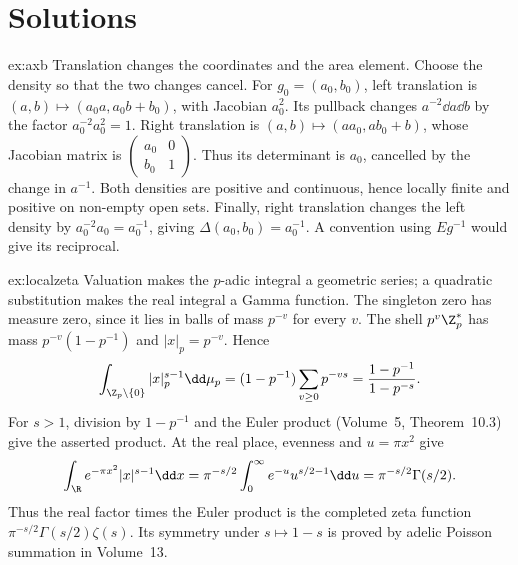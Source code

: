 \section{Solutions}
\begin{solution}{ex:axb}
\idea Translation changes the coordinates and the area element. Choose the density so that the two changes cancel.
\writeup For $g_0=(a_0,b_0)$, left translation is $(a,b)\mapsto(a_0a,a_0b+b_0)$, with Jacobian $a_0^2$. Its pullback changes $a^{-2}\dd a\dd b$ by the factor $a_0^{-2}a_0^2=1$. Right translation is $(a,b)\mapsto(aa_0,ab_0+b)$, whose Jacobian matrix is $\begin{pmatrix}a_0&0\\b_0&1\end{pmatrix}$. Thus its determinant is $a_0$, cancelled by the change in $a^{-1}$. Both densities are positive and continuous, hence locally finite and positive on non-empty open sets. Finally, right translation changes the left density by $a_0^{-2}a_0=a_0^{-1}$, giving $\Delta(a_0,b_0)=a_0^{-1}$. A convention using $Eg^{-1}$ would give its reciprocal.
\end{solution}
\begin{solution}{ex:localzeta}
\idea Valuation makes the $p$-adic integral a geometric series; a quadratic substitution makes the real integral a Gamma function.
\writeup The singleton zero has measure zero, since it lies in balls of mass $p^{-v}$ for every $v$. The shell $p^v\Z_p^*$ has mass $p^{-v}(1-p^{-1})$ and $|x|_p=p^{-v}$. Hence
\[\int_{\Z_p\setminus\{0\}}|x|_p^{s-1}\dd\mu_p
 =(1-p^{-1})\sum_{v\ge0}p^{-vs}=\frac{1-p^{-1}}{1-p^{-s}}.
\]
For $s>1$, division by $1-p^{-1}$ and the Euler product (Volume~5, Theorem~10.3) give the asserted product. At the real place, evenness and $u=\pi x^2$ give
\[\int_\R e^{-\pi x^2}|x|^{s-1}\dd x
 =\pi^{-s/2}\int_0^\infty e^{-u}u^{s/2-1}\dd u
 =\pi^{-s/2}\Gamma(s/2).
\]
Thus the real factor times the Euler product is the completed zeta function $\pi^{-s/2}\Gamma(s/2)\zeta(s)$. Its symmetry under $s\mapsto1-s$ is proved by adelic Poisson summation in Volume~13.
\end{solution}
